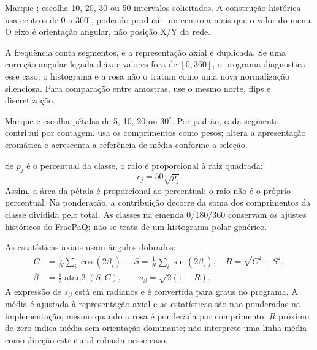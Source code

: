 Marque ; escolha 10, 20, 30 ou 50 intervalos solicitados. A construção histórica usa centros de 0 a \(360^\circ\), podendo produzir um centro a mais que o valor do menu. O eixo é orientação angular, não posição X/Y da rede.

A frequência conta segmentos, e a representação axial é duplicada. Se uma correção angular legada deixar valores fora de \([0,360]\), o programa diagnostica esse caso; o histograma e a rosa não o tratam como uma nova normalização silenciosa. Para comparação entre amostras, use o mesmo norte, flips e discretização.

Marque  e escolha pétalas de 5, 10, 20 ou \(30^\circ\). Por padrão, cada segmento contribui por contagem.  usa os comprimentos como pesos;  altera a apresentação cromática e  acrescenta a referência de média conforme a seleção.

Se \(p_j\) é o percentual da classe, o raio é proporcional à raiz quadrada:
\begin{equation}r_j=50\sqrt{p_j}.\end{equation}
Assim, a área da pétala é proporcional ao percentual; o raio não é o próprio percentual. Na ponderação, a contribuição decorre da soma dos comprimentos da classe dividida pelo total. As classes na emenda 0/180/360 conservam os ajustes históricos do FracPaQ; não se trata de um histograma polar genérico.

As estatísticas axiais usam ângulos dobrados:
\begin{align}
C&=\frac1N\sum_i\cos(2\beta_i),\quad
S=\frac1N\sum_i\sin(2\beta_i),\quad R=\sqrt{C^2+S^2},\\
\overline\beta&=\frac12\operatorname{atan2}(S,C),\qquad
s_\beta=\sqrt{2(1-R)}.
\end{align}
A expressão de \(s_\beta\) está em radianos e é convertida para graus no programa. A média é ajustada à representação axial e as estatísticas são não ponderadas na implementação, mesmo quando a rosa é ponderada por comprimento. \(R\) próximo de zero indica média sem orientação dominante; não interprete uma linha média como direção estrutural robusta nesse caso.

